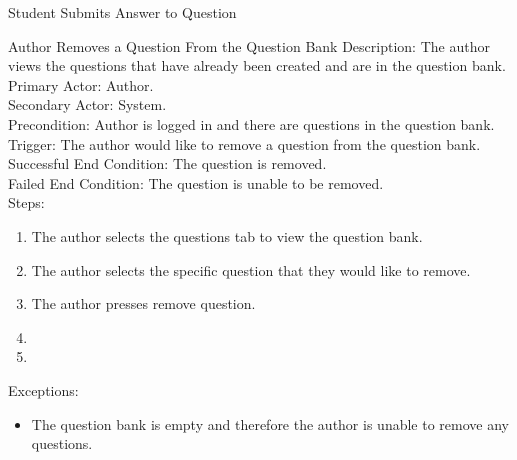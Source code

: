\begin{section}{Student Submits Answer to Question}
    
    \begin{section}{Author Removes a Question From the Question Bank}
    Description: The author views the questions that have already been created and are in the question bank. \\
        Primary Actor: Author.  \\
        Secondary Actor: System. \\
        Precondition: Author is logged in and there are questions in the question bank.\\
        Trigger: The author would like to remove a question from the question bank. \\
        Successful End Condition:  The question is removed. \\
        Failed End Condition: The question is unable to be removed.\\
        \newline
        Steps:
        \begin{enumerate}
            \item{The author selects the questions tab to view the question bank.}
            \item{The author selects the specific question that they would like to remove.}
            \item{The author presses remove question.}
            \item{}
            \item{}
        \end{enumerate}
        Exceptions:
        \begin{itemize}
            \item{The question bank is empty and therefore the author is unable to remove any questions.}
        \end{itemize}
    \end{section}
    

\end{section}
